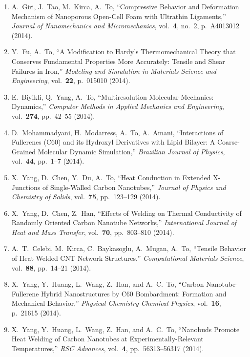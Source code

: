 \begin{enumerate}
\item A.\ Giri, J.\ Tao, M.\ Kirca, A.\ To, ``Compressive Behavior and
  Deformation Mechanism of Nanoporous Open-Cell Foam with Ultrathin
  Ligaments,'' \textit{Journal of Nanomechanics and Micromechanics},
  vol.\ \textbf{4}, no.\ 2, p.\ A4013012 (2014).

\item Y.\ Fu, A.\ To, ``A Modification to Hardy's Thermomechanical
  Theory that Conserves Fundamental Properties More Accurately:
  Tensile and Shear Failures in Iron,'' \textit{Modeling and
    Simulation in Materials Science and Engineering},
  vol.\ \textbf{22}, p.\ 015010 (2014).

\item E.\ Biyikli, Q.\ Yang, A.\ To, ``Multiresolution Molecular
  Mechanics: Dynamics,'' \textit{Computer Methods in Applied Mechanics
    and Engineering}, vol.\ \textbf{274}, pp.\ 42--55 (2014).

\item D.\ Mohammadyani, H.\ Modarress, A.\ To, A.\ Amani,
  ``Interactions of Fullerenes (C60) and its Hydroxyl Derivatives with
  Lipid Bilayer: A Coarse-Grained Molecular Dynamic Simulation,''
  \textit{Brazilian Journal of Physics}, vol.\ \textbf{44}, pp.\ 1--7
  (2014).

\item X.\ Yang, D.\ Chen, Y.\ Du, A.\ To, ``Heat Conduction in
  Extended X-Junctions of Single-Walled Carbon Nanotubes,''
  \textit{Journal of Physics and Chemistry of Solids},
  vol.\ \textbf{75}, pp.\ 123--129 (2014).

\item X.\ Yang, D.\ Chen, Z.\ Han, ``Effects of Welding on Thermal
  Conductivity of Randomly Oriented Carbon Nanotube Networks,''
  \textit{International Journal of Heat and Mass Transfer},
  vol.\ \textbf{70}, pp.\ 803--810 (2014).

\item A.\ T.\ Celebi, M.\ Kirca, C.\ Baykasoglu, A.\ Mugan, A.\ To,
  ``Tensile Behavior of Heat Welded CNT Network Structures,''
  \textit{Computational Materials Science}, vol.\ \textbf{88},
  pp.\ 14--21 (2014).

\item X.\ Yang, Y.\ Huang, L.\ Wang, Z.\ Han, and A.\ C.\ To, ``Carbon
  Nanotube-Fullerene Hybrid Nanostructures by C60 Bombardment:
  Formation and Mechanical Behavior,'' \textit{Physical Chemistry
    Chemical Physics}, vol.\ \textbf{16}, p.\ 21615 (2014).

\item X.\ Yang, Y.\ Huang, L.\ Wang, Z.\ Han, and A.\ C.\ To,
  ``Nanobuds Promote Heat Welding of Carbon Nanotubes at
  Experimentally-Relevant Temperatures,'' \textit{RSC Advances},
  vol.\ \textbf{4}, pp.\ 56313--56317 (2014).


\end{enumerate}
